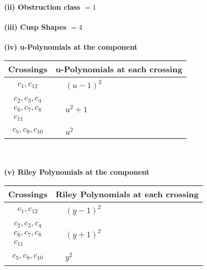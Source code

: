 \documentclass[1p]{elsarticle_modified}
\theoremstyle{definition}
\begin{document}
\flushleft \textbf{(ii) Obstruction class $= 1$}\\~\\
\flushleft \textbf{(iii) Cusp Shapes $= 4$}\\~\\
\newpage\renewcommand{\arraystretch}{1}
\flushleft \textbf{(iv) u-Polynomials at the component}\newline \\
\begin{tabular}{m{50pt}|m{274pt}}
Crossings & \hspace{64pt}u-Polynomials at each crossing \\
\hline $$\begin{aligned}c_{1},c_{12}\end{aligned}$$&$\begin{aligned}
&(u-1)^2
\end{aligned}$\\
\hline $$\begin{aligned}c_{2},c_{3},c_{4}\\c_{6},c_{7},c_{8}\\c_{11}\end{aligned}$$&$\begin{aligned}
&u^2+1
\end{aligned}$\\
\hline $$\begin{aligned}c_{5},c_{9},c_{10}\end{aligned}$$&$\begin{aligned}
&u^2
\end{aligned}$\\
\hline
\end{tabular}\\~\\
\newpage\renewcommand{\arraystretch}{1}
\flushleft \textbf{(v) Riley Polynomials at the component}\newline \\
\begin{tabular}{m{50pt}|m{274pt}}
Crossings & \hspace{64pt}Riley Polynomials at each crossing \\
\hline $$\begin{aligned}c_{1},c_{12}\end{aligned}$$&$\begin{aligned}
&(y-1)^2
\end{aligned}$\\
\hline $$\begin{aligned}c_{2},c_{3},c_{4}\\c_{6},c_{7},c_{8}\\c_{11}\end{aligned}$$&$\begin{aligned}
&(y+1)^2
\end{aligned}$\\
\hline $$\begin{aligned}c_{5},c_{9},c_{10}\end{aligned}$$&$\begin{aligned}
&y^2
\end{aligned}$\\
\hline
\end{tabular}\\~\\
\end{document}
